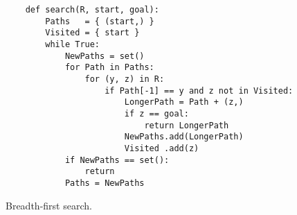 \begin{figure}[!ht]
  \centering
\begin{verbatim}
    def search(R, start, goal):
        Paths   = { (start,) }
        Visited = { start }
        while True:
            NewPaths = set()
            for Path in Paths:
                for (y, z) in R:
                    if Path[-1] == y and z not in Visited:
                        LongerPath = Path + (z,)
                        if z == goal:
                            return LongerPath
                        NewPaths.add(LongerPath)
                        Visited .add(z)
            if NewPaths == set():
                return
            Paths = NewPaths
\end{verbatim} 
\vspace*{-0.3cm}
\caption{Breadth-first search.}  \label{fig:Breadth-First-Search.ipynb}
\end{figure} %


